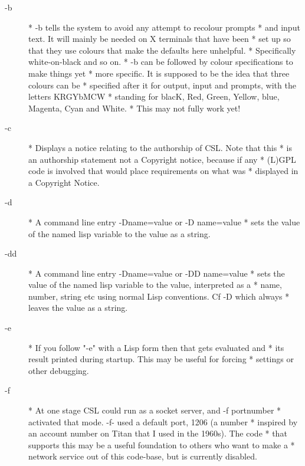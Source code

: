\documentclass[a4paper,11pt]{article}
\begin{document}
\begin{description}
\item [{\ttfamily -b}] 
          * {\ttfamily -b} tells the system to avoid any attempt to recolour prompts
          * and input text. It will mainly be needed on X terminals that have been
          * set up so that they use colours that make the defaults here unhelpful.
          * Specifically white-on-black and so on.
          * {\ttfamily -b} can be followed by colour specifications to make things yet
          * more specific. It is supposed to be the idea that three colours can be
          * specified after it for output, input and prompts, with the letters KRGYbMCW
          * standing for blacK, Red, Green, Yellow, blue, Magenta, Cyan and White.
          * This may not fully work yet!

\item [{\ttfamily -c}] 
          * Displays a notice relating to the authorship of CSL. Note that this
          * is an authorship statement not a Copyright notice, because if any
          * (L)GPL code is involved that would place requirements on what was
          * displayed in a Copyright Notice.

\item [{\ttfamily -d}] 
          * A command line entry {\ttfamily -Dname=value} or {\ttfamily -D name=value}
          * sets the value of the named lisp variable to the value as a string.

\item [{\ttfamily -dd}] 
          * A command line entry {\ttfamily -Dname=value} or {\ttfamily -DD name=value}
          * sets the value of the named lisp variable to the value, interpreted as a
          * name, number, string etc using normal Lisp conventions. Cf -D which always
          * leaves the value as a string.

\item [{\ttfamily -e}] 
          * If you follow "-e" with a Lisp form then that gets evaluated and
          * its result printed during startup. This may be useful for forcing
          * settings or other debugging.

\item [{\ttfamily -f}] 
          * At one stage CSL could run as a socket server, and {\ttfamily -f portnumber}
          * activated that mode. {\ttfamily -f-} used a default port, 1206 (a number
          * inspired by an account number on Titan that I used in the 1960s). The code
          * that supports this may be a useful foundation to others who want to make a
          * network service out of this code-base, but is currently disabled.


\end{description}
\end{document}
